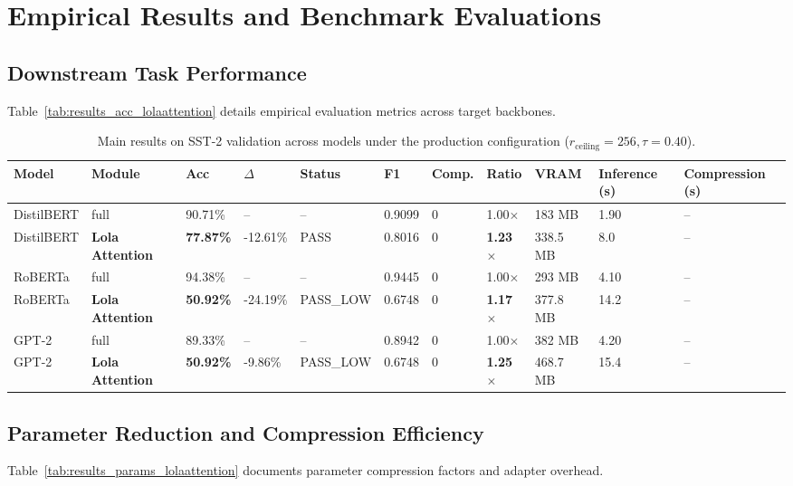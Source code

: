 \section{Empirical Results and Benchmark Evaluations}

\subsection{Downstream Task Performance}
Table~\ref{tab:results_acc_lolaattention} details empirical evaluation metrics across target backbones.

\begin{table}[t]
\centering
\small
\begin{tabular}{lllllllllll}
\toprule
\textbf{Model} & \textbf{Module} & \textbf{Acc} & \textbf{$\Delta$} & \textbf{Status} & \textbf{F1} & \textbf{Comp.} & \textbf{Ratio} & \textbf{VRAM} & \textbf{Inference (s)} & \textbf{Compression (s)} \\
\midrule
DistilBERT & full & 90.71\% & -- & -- & 0.9099 & 0 & 1.00$\times$ & 183 MB & 1.90 & -- \\
DistilBERT & \textbf{Lola Attention} & \textbf{77.87\%} & -12.61\% & PASS & 0.8016 & 0 & \textbf{1.23$\times$} & 338.5 MB & 8.0 & -- \\
RoBERTa & full & 94.38\% & -- & -- & 0.9445 & 0 & 1.00$\times$ & 293 MB & 4.10 & -- \\
RoBERTa & \textbf{Lola Attention} & \textbf{50.92\%} & -24.19\% & PASS\_LOW & 0.6748 & 0 & \textbf{1.17$\times$} & 377.8 MB & 14.2 & -- \\
GPT-2 & full & 89.33\% & -- & -- & 0.8942 & 0 & 1.00$\times$ & 382 MB & 4.20 & -- \\
GPT-2 & \textbf{Lola Attention} & \textbf{50.92\%} & -9.86\% & PASS\_LOW & 0.6748 & 0 & \textbf{1.25$\times$} & 468.7 MB & 15.4 & -- \\
\bottomrule
\end{tabular}
\caption{Main results on SST-2 validation across models under the production configuration ($r_{\mathrm{ceiling}}=256, \tau=0.40$).}
\label{tab:main_sst2}
\end{table}

\subsection{Parameter Reduction and Compression Efficiency}
Table~\ref{tab:results_params_lolaattention} documents parameter compression factors and adapter overhead.


